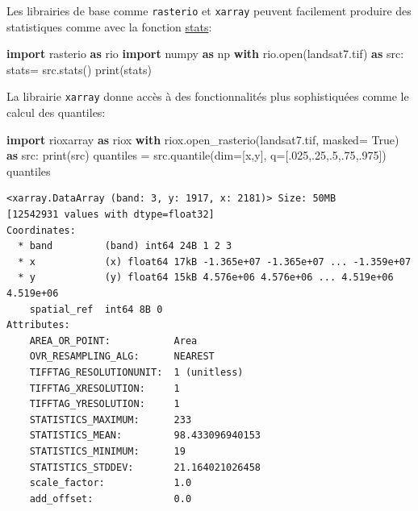 \documentclass[
]{article}
\newenvironment{Shaded}{}{}
\newcommand{\BuiltInTok}[1]{\textcolor[rgb]{0.00,0.50,0.00}{#1}}
\newcommand{\ControlFlowTok}[1]{\textcolor[rgb]{0.00,0.44,0.13}{\textbf{#1}}}
\newcommand{\FloatTok}[1]{\textcolor[rgb]{0.25,0.63,0.44}{#1}}
\newcommand{\ImportTok}[1]{\textcolor[rgb]{0.00,0.50,0.00}{\textbf{#1}}}
\newcommand{\NormalTok}[1]{#1}
\newcommand{\OperatorTok}[1]{\textcolor[rgb]{0.40,0.40,0.40}{#1}}
\newcommand{\StringTok}[1]{\textcolor[rgb]{0.25,0.44,0.63}{#1}}
\newcommand{\VariableTok}[1]{\textcolor[rgb]{0.10,0.09,0.49}{#1}}
\begin{document}
Les librairies de base comme \texttt{rasterio} et \texttt{xarray}
peuvent facilement produire des statistiques comme avec la fonction
\href{https://rasterio.readthedocs.io/en/stable/api/rasterio.io.html\#rasterio.io.BufferedDatasetWriter.stats}{stats}:

\label{30e811fb}
\label{cb12}
\begin{Shaded}
\begin{Highlighting}[]
\ImportTok{import}\NormalTok{ rasterio }\ImportTok{as}\NormalTok{ rio}
\ImportTok{import}\NormalTok{ numpy }\ImportTok{as}\NormalTok{ np}
\ControlFlowTok{with}\NormalTok{ rio.}\BuiltInTok{open}\NormalTok{(}\StringTok{\textquotesingle{}landsat7.tif\textquotesingle{}}\NormalTok{) }\ImportTok{as}\NormalTok{ src:}
\NormalTok{    stats}\OperatorTok{=}\NormalTok{ src.stats()}
    \BuiltInTok{print}\NormalTok{(stats)}
\end{Highlighting}
\end{Shaded}

La librairie \texttt{xarray} donne accès à des fonctionnalités plus
sophistiquées comme le calcul des quantiles:

\label{0e71bc4f}
\label{cb13}
\begin{Shaded}
\begin{Highlighting}[]
\ImportTok{import}\NormalTok{ rioxarray }\ImportTok{as}\NormalTok{ riox}
\ControlFlowTok{with}\NormalTok{ riox.open\_rasterio(}\StringTok{\textquotesingle{}landsat7.tif\textquotesingle{}}\NormalTok{, masked}\OperatorTok{=} \VariableTok{True}\NormalTok{) }\ImportTok{as}\NormalTok{ src:}
    \BuiltInTok{print}\NormalTok{(src)}
\NormalTok{quantiles }\OperatorTok{=}\NormalTok{ src.quantile(dim}\OperatorTok{=}\NormalTok{[}\StringTok{\textquotesingle{}x\textquotesingle{}}\NormalTok{,}\StringTok{\textquotesingle{}y\textquotesingle{}}\NormalTok{], q}\OperatorTok{=}\NormalTok{[}\FloatTok{.025}\NormalTok{,}\FloatTok{.25}\NormalTok{,}\FloatTok{.5}\NormalTok{,}\FloatTok{.75}\NormalTok{,}\FloatTok{.975}\NormalTok{])}
\NormalTok{quantiles}
\end{Highlighting}
\end{Shaded}

\begin{verbatim}
<xarray.DataArray (band: 3, y: 1917, x: 2181)> Size: 50MB
[12542931 values with dtype=float32]
Coordinates:
  * band         (band) int64 24B 1 2 3
  * x            (x) float64 17kB -1.365e+07 -1.365e+07 ... -1.359e+07
  * y            (y) float64 15kB 4.576e+06 4.576e+06 ... 4.519e+06 4.519e+06
    spatial_ref  int64 8B 0
Attributes:
    AREA_OR_POINT:           Area
    OVR_RESAMPLING_ALG:      NEAREST
    TIFFTAG_RESOLUTIONUNIT:  1 (unitless)
    TIFFTAG_XRESOLUTION:     1
    TIFFTAG_YRESOLUTION:     1
    STATISTICS_MAXIMUM:      233
    STATISTICS_MEAN:         98.433096940153
    STATISTICS_MINIMUM:      19
    STATISTICS_STDDEV:       21.164021026458
    scale_factor:            1.0
    add_offset:              0.0
\end{verbatim}
\end{document}
